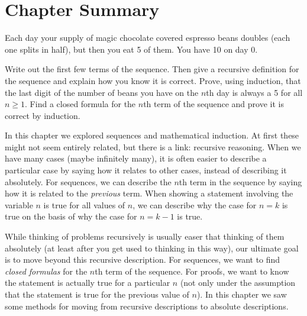 \documentclass[12pt]{article}
\begin{document}
\section{Chapter Summary}

\begin{activity}
Each day your supply of magic chocolate covered espresso beans doubles (each one splits in half), but then you eat 5 of them.  You have 10 on day 0. 

\begin{questions}
\question Write out the first few terms of the sequence.  Then give a recursive definition for the sequence and explain how you know it is correct.  
\question Prove, using induction, that the last digit of the number of beans you have on the $n$th day is always a 5 for all $n \ge 1$.
\question Find a closed formula for the $n$th term of the sequence and prove it is correct by induction.
\end{questions}

\end{activity}

In this chapter we explored sequences and mathematical induction.  At first these might not seem entirely related, but there is a link: recursive reasoning.  When we have many cases (maybe infinitely many), it is often easier to describe a particular case by saying how it relates to other cases, instead of describing it absolutely.  For sequences, we can describe the $n$th term in the sequence by saying how it is related to the \emph{previous} term.  When showing a statement involving the variable $n$ is true for all values of $n$, we can describe why the case for $n = k$ is true on the basis of why the case for $n = k-1$ is true.  

While thinking of problems recursively is usually easer that thinking of them absolutely (at least after you get used to thinking in this way), our ultimate goal is to move beyond this recursive description.  For sequences, we want to find \emph{closed formulas} for the $n$th term of the sequence.  For proofs, we want to know the statement is actually true for a particular $n$ (not only under the assumption that the statement is true for the previous value of $n$). In this chapter we saw some methods for moving from recursive descriptions to absolute descriptions.
\end{document}
